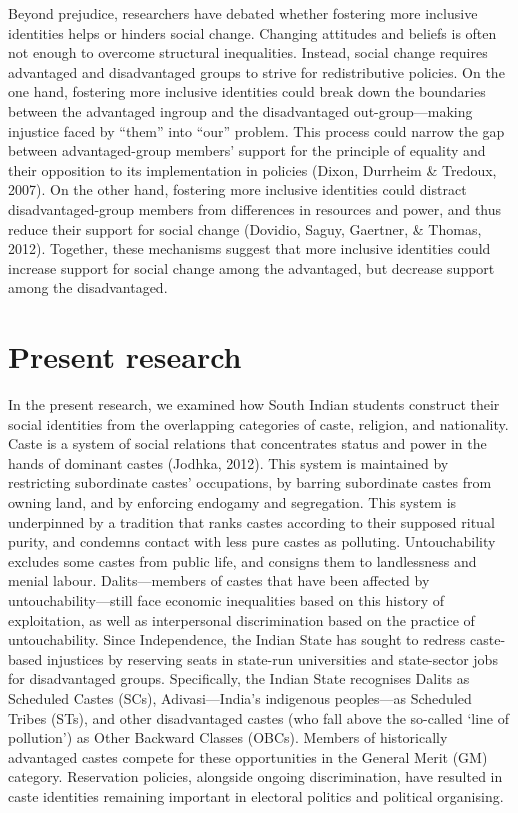 \documentclass[12pt, a4paper]{article}
\begin{document}
Beyond prejudice, researchers have debated whether fostering more inclusive identities helps or hinders social change. Changing attitudes and beliefs is often not enough to overcome structural inequalities. Instead, social change requires advantaged and disadvantaged groups to strive for redistributive policies. On the one hand, fostering more inclusive identities could break down the boundaries between the advantaged ingroup and the disadvantaged out-group---making injustice faced by ``them'' into ``our'' problem. This process could narrow the gap between advantaged-group members' support for the principle of equality and their opposition to its implementation in policies (Dixon, Durrheim \& Tredoux, 2007). On the other hand, fostering more inclusive identities could distract disadvantaged-group members from differences in resources and power, and thus reduce their support for social change (Dovidio, Saguy, Gaertner, \& Thomas, 2012). Together, these mechanisms suggest that more inclusive identities could increase support for social change among the advantaged, but decrease support among the disadvantaged.

\section{Present research}

In the present research, we examined how South Indian students construct their social identities from the overlapping categories of caste, religion, and nationality. Caste is a system of social relations that concentrates status and power in the hands of dominant castes (Jodhka, 2012). This system is maintained by restricting subordinate castes' occupations, by barring subordinate castes from owning land, and by enforcing endogamy and segregation. This system is underpinned by a tradition that ranks castes according to their supposed ritual purity, and condemns contact with less pure castes as polluting. Untouchability excludes some castes from public life, and consigns them to landlessness and menial labour. Dalits---members of castes that have been affected by untouchability---still face economic inequalities based on this history of exploitation, as well as interpersonal discrimination based on the practice of untouchability. Since Independence, the Indian State has sought to redress caste-based injustices by reserving seats in state-run universities and state-sector jobs for disadvantaged groups. Specifically, the Indian State recognises Dalits as Scheduled Castes (SCs), Adivasi---India’s indigenous peoples---as Scheduled Tribes (STs), and other disadvantaged castes (who fall above the so-called `line of pollution') as Other Backward Classes (OBCs). Members of historically advantaged castes compete for these opportunities in the General Merit (GM) category. Reservation policies, alongside ongoing discrimination, have resulted in caste identities remaining important in electoral politics and political organising.
\end{document}
